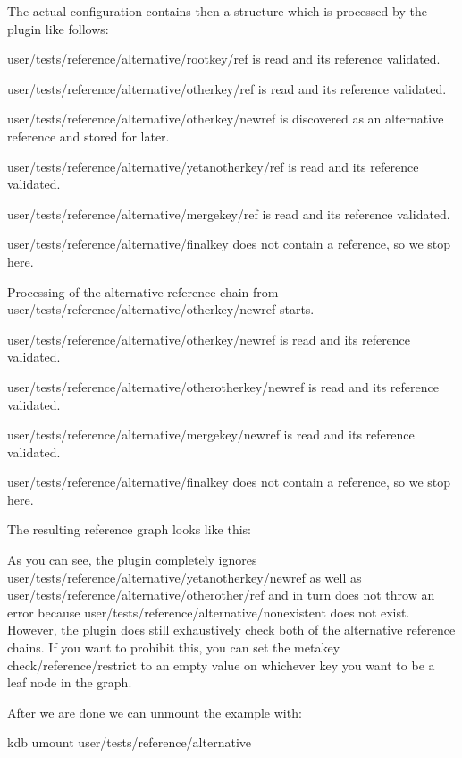 The actual configuration contains then a structure which is processed by the plugin like follows\+:


\begin{DoxyEnumerate}
\item {\ttfamily user/tests/reference/alternative/rootkey/ref} is read and its reference validated.
\item {\ttfamily user/tests/reference/alternative/otherkey/ref} is read and its reference validated.
\end{DoxyEnumerate}
\begin{DoxyEnumerate}
\item {\ttfamily user/tests/reference/alternative/otherkey/newref} is discovered as an alternative reference and stored for later.
\item {\ttfamily user/tests/reference/alternative/yetanotherkey/ref} is read and its reference validated.
\item {\ttfamily user/tests/reference/alternative/mergekey/ref} is read and its reference validated.
\item {\ttfamily user/tests/reference/alternative/finalkey} does not contain a reference, so we stop here.
\item Processing of the alternative reference chain from {\ttfamily user/tests/reference/alternative/otherkey/newref} starts.
\item {\ttfamily user/tests/reference/alternative/otherkey/newref} is read and its reference validated.
\item {\ttfamily user/tests/reference/alternative/otherotherkey/newref} is read and its reference validated.
\item {\ttfamily user/tests/reference/alternative/mergekey/newref} is read and its reference validated.
\item {\ttfamily user/tests/reference/alternative/finalkey} does not contain a reference, so we stop here.
\end{DoxyEnumerate}

The resulting reference graph looks like this\+:



As you can see, the plugin completely ignores {\ttfamily user/tests/reference/alternative/yetanotherkey/newref} as well as {\ttfamily user/tests/reference/alternative/otherother/ref} and in turn does not throw an error because {\ttfamily user/tests/reference/alternative/nonexistent} does not exist. However, the plugin does still exhaustively check both of the alternative reference chains. If you want to prohibit this, you can set the metakey {\ttfamily check/reference/restrict} to an empty value on whichever key you want to be a leaf node in the graph.

After we are done we can unmount the example with\+: 
\begin{DoxyCode}
kdb umount user/tests/reference/alternative
\end{DoxyCode}
 